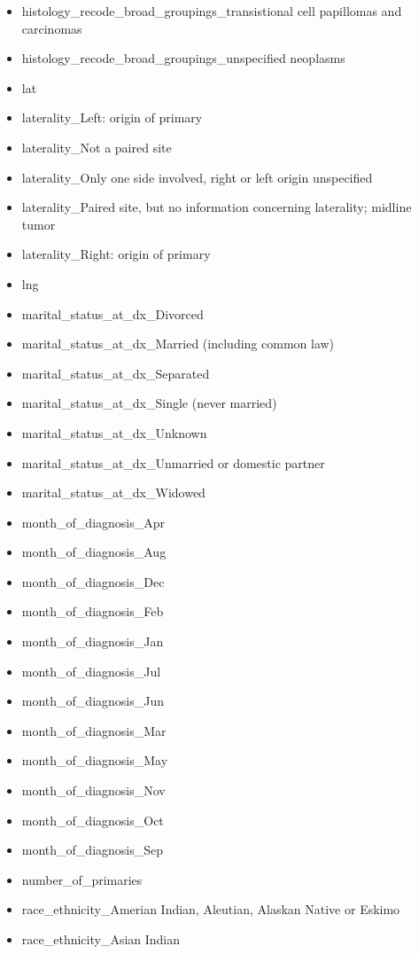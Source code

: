 \documentclass[10pt,letterpaper]{article}
\begin{document}
\begin{itemize}[noitemsep]
\item histology\_recode\_broad\_groupings\_transistional cell papillomas and carcinomas
\item histology\_recode\_broad\_groupings\_unspecified neoplasms
\item lat
\item laterality\_Left: origin of primary
\item laterality\_Not a paired site
\item laterality\_Only one side involved, right or left origin unspecified
\item laterality\_Paired site, but no information concerning laterality; midline tumor
\item laterality\_Right: origin of primary
\item lng
\item marital\_status\_at\_dx\_Divorced
\item marital\_status\_at\_dx\_Married (including common law)
\item marital\_status\_at\_dx\_Separated
\item marital\_status\_at\_dx\_Single (never married)
\item marital\_status\_at\_dx\_Unknown
\item marital\_status\_at\_dx\_Unmarried or domestic partner
\item marital\_status\_at\_dx\_Widowed
\item month\_of\_diagnosis\_Apr
\item month\_of\_diagnosis\_Aug
\item month\_of\_diagnosis\_Dec
\item month\_of\_diagnosis\_Feb
\item month\_of\_diagnosis\_Jan
\item month\_of\_diagnosis\_Jul
\item month\_of\_diagnosis\_Jun
\item month\_of\_diagnosis\_Mar
\item month\_of\_diagnosis\_May
\item month\_of\_diagnosis\_Nov
\item month\_of\_diagnosis\_Oct
\item month\_of\_diagnosis\_Sep
\item number\_of\_primaries
\item race\_ethnicity\_Amerian Indian, Aleutian, Alaskan Native or Eskimo
\item race\_ethnicity\_Asian Indian

\end{itemize}
\end{document}
